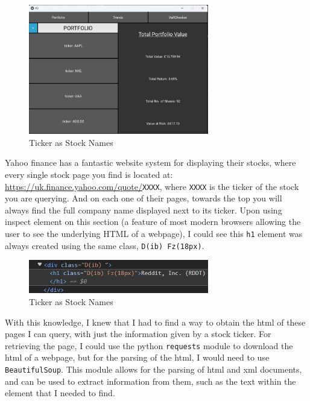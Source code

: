\documentclass{article}
\begin{document}
\begin{figure}[h]
  \centering
  \includegraphics[width=0.7\textwidth]{Images/Term 2 Images/image (15).png}
  \caption{Ticker as Stock Names}
  \label{fig:Ticker Names}
\end{figure}

Yahoo finance has a fantastic website system for displaying their stocks, where every single stock page you find is located at: \url{https://uk.finance.yahoo.com/quote/}\texttt{XXXX}, where \texttt{XXXX} is the ticker of the stock you are querying. And on each one of their pages, towards the top you will always find the full company name displayed next to its ticker. Upon using inspect element on this section (a feature of most modern browsers allowing the user to see the underlying HTML of a webpage), I could see this \texttt{h1} element was always created using the same class, \texttt{D(ib) Fz(18px)}.\\\vspace{0.3cm}

\begin{figure}[h]
  \centering
  \includegraphics[width=0.7\textwidth]{Images/Term 2 Images/HTML Element.png}
  \caption{Ticker as Stock Names}
  \label{fig:Ticker Names}
\end{figure}

\vspace{0.3cm}
With this knowledge, I knew that I had to find a way to obtain the html of these pages I can query, with just the information given by a stock ticker. For retrieving the page, I could use the python \texttt{requests} module to download the html of a webpage, but for the parsing of the html, I would need to use \texttt{BeautifulSoup}. This module allows for the parsing of html and xml documents, and can be used to extract information from them, such as the text within the element that I needed to find.
\end{document}
